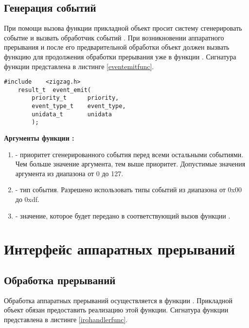 \subsection{Генерация событий }

При помощи вызова функции  прикладной объект просит систему \zigzag сгенерировать событие и вызвать обработчик
событий . При возникновении аппаратного прерывания и после его предварительной обработки объект должен вызвать
функцию  для продолжения обработки прерывания уже в функции . Сигнатура функции 
представлена в листинге \ref{eventemitfunc}.

\begin{lstlisting}[caption=Функция \myfunc{event\_emit()} - генерация события., label=eventemitfunc ]
    #include    <zigzag.h>
    result_t  event_emit(
        priority_t      priority,
        event_type_t    event_type,
        unidata_t       unidata
        );
\end{lstlisting}

{\bfseries Аргументы функции :}

{\itshape
\begin{enumerate}
\item {} - приоритет сгенерированного события перед всеми остальными событиями. Чем больше значение аргумента, тем выше
приоритет. Допустимые значения аргумента из диапазона от 0 до 127.
\item {} - тип события. Разрешено использовать типы событий из диапазона от 0x00 до 0xdf.
\item {} - значение, которое будет передано в соответствующий вызов функции .
\end{enumerate}
}

\section{Интерфейс аппаратных прерываний}
\subsection{Обработка прерываний}

Обработка аппаратных прерываний осуществляется в функции . Прикладной объект обязан 
предоставить реализацию этой функции. Сигнатура функции представлена в листинге \ref{irqhandlerfunc}.

